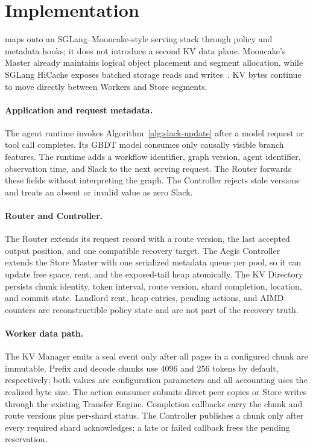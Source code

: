 \section{Implementation}
\label{sec:implementation}

\system{} maps onto an SGLang--Mooncake-style serving stack through policy
and metadata hooks; it does not introduce a second KV data plane.  Mooncake's
Master already maintains
logical object placement and segment allocation, while SGLang HiCache exposes
batched storage reads and writes~\cite{qin2025mooncake,xie2025hicache}.  KV
bytes continue to move directly between Workers and Store segments.

\paragraph{Application and request metadata.}
The agent runtime invokes Algorithm~\ref{alg:slack-update} after a model request
or tool call completes.  Its GBDT model consumes only causally visible branch
features.  The runtime adds a workflow identifier, graph version, agent
identifier, observation time, and Slack to the next serving request.  The
Router forwards these fields without interpreting the graph.  The Controller
rejects stale versions and treats an absent or invalid value as zero Slack.

\paragraph{Router and Controller.}
The Router extends its request record with a route version, the last accepted
output position, and one compatible recovery target.  The Aegis Controller
extends the Store Master with one serialized metadata queue per pool, so it can
update free space, rent, and the exposed-tail heap atomically.  The KV
Directory persists chunk identity, token interval, route version, shard
completion, location, and commit state.  Landlord rent, heap entries, pending
actions, and AIMD counters are reconstructible policy state and are not part of
the recovery truth.

\paragraph{Worker data path.}
The KV Manager emits a seal event only after all pages in a configured chunk
are immutable.  Prefix and decode chunks use 4096 and 256 tokens by default,
respectively; both values are configuration parameters and all accounting uses
the realized byte size.  The action consumer submits direct peer copies or
Store writes through the existing Transfer Engine.  Completion callbacks carry
the chunk and route versions plus per-shard status.  The Controller publishes a
chunk only after every required shard acknowledges; a late or failed callback
frees the pending reservation.

